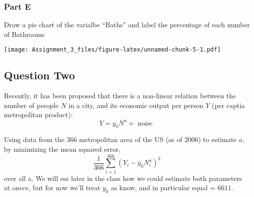 \documentclass[]{article}
\newenvironment{Shaded}{\begin{snugshade}}{\end{snugshade}}
\newcommand{\KeywordTok}[1]{\textcolor[rgb]{0.13,0.29,0.53}{\textbf{#1}}}
\newcommand{\DataTypeTok}[1]{\textcolor[rgb]{0.13,0.29,0.53}{#1}}
\newcommand{\DecValTok}[1]{\textcolor[rgb]{0.00,0.00,0.81}{#1}}
\newcommand{\StringTok}[1]{\textcolor[rgb]{0.31,0.60,0.02}{#1}}
\newcommand{\CommentTok}[1]{\textcolor[rgb]{0.56,0.35,0.01}{\textit{#1}}}
\newcommand{\OperatorTok}[1]{\textcolor[rgb]{0.81,0.36,0.00}{\textbf{#1}}}
\newcommand{\NormalTok}[1]{#1}
\begin{document}
\subsubsection{Part E}\label{part-e}

Draw a pie chart of the varialbe ``Baths'' and label the percentage of
each number of Bathrooms

\begin{Shaded}
\end{Shaded}

\texttt{[image: Assignment\_3\_files/figure-latex/unnamed-chunk-5-1.pdf]}

\subsection{Question Two}\label{question-two}

Recently, it has been proposed that there is a non-linear relation
between the number of perople \(N\) in a city, and its economic output
per person \(Y\) (per captia \gross metropolitan product):
\[Y = y_0N^a + \text{ noise }\]

Using data from the 366 metropolitan area of the US (as of 2006) to
estimate \(a\), by minimizing the mean squared error,
\[\frac{1}{366} \sum_{i=1}^366 (Y_i - y_0N_i^a)^2\] over all a. We will
ess later in the class how we could estimate both parameters at onece,
but for now we'll treat \(y_0\) as know, and in particular equal =
\(6611\).
\end{document}

